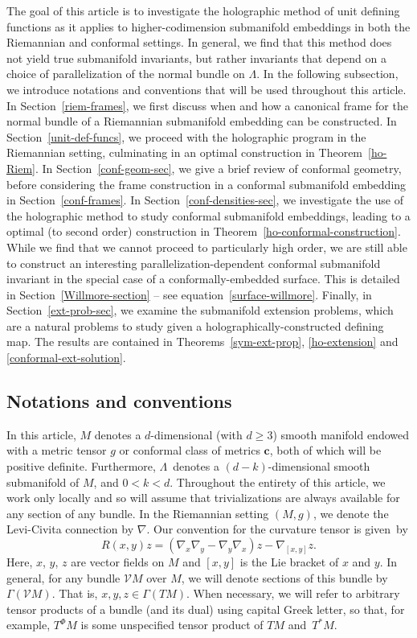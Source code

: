 \documentclass[pdftex]{sigma}
\numberwithin{equation}{section}
\newcommand{\cc}{\boldsymbol{c}}
\renewcommand{\=}{\stackrel \Lambda =}
\begin{document}
The goal of this article is to investigate the holographic method of unit defining functions as it applies to higher-codimension submanifold embeddings in both the Riemannian and conformal settings. In general, we find that this method does not yield true submanifold invariants, but rather invariants that depend on a choice of parallelization of the normal bundle on $\Lambda$. In the following subsection, we introduce notations and conventions that will be used throughout this article. In Section~\ref{riem-frames}, we first discuss when and how a canonical frame for the normal bundle of a Riemannian submanifold embedding can be constructed. In Section~\ref{unit-def-funcs}, we proceed with the holographic program in the Riemannian setting, culminating in an optimal construction in Theorem~\ref{ho-Riem}. In Section~\ref{conf-geom-sec}, we give a brief review of conformal geometry, before considering the frame construction in a conformal submanifold embedding in Section~\ref{conf-frames}. In Section~\ref{conf-densities-sec}, we investigate the use of the holographic method to study conformal submanifold embeddings, leading to a optimal (to second order) construction in Theorem~\ref{ho-conformal-construction}. While we find that we cannot proceed to particularly high order, we are still able to construct an interesting parallelization-dependent conformal submanifold invariant in the special case of a conformally-embedded surface. This is detailed in Section~\ref{Willmore-section} -- see equation~\eqref{surface-willmore}. Finally, in Section~\ref{ext-prob-sec}, we examine the submanifold extension problems, which are a natural problems to study given a holographically-constructed defining map. The results are contained in Theorems~\ref{sym-ext-prop}, \ref{ho-extension} and \ref{conformal-ext-solution}.

\subsection{Notations and conventions}
In this article, $M$ denotes a $d$-dimensional (with $d \geq 3$) smooth manifold endowed with a metric tensor $g$ or conformal class of metrics $\cc$, both of which will be positive definite. Furthermore, $\Lambda$~denotes a $(d-k)$-dimensional smooth submanifold of $M$, and $0 < k < d$. Throughout the entirety of this article, we work only locally and so will assume that trivializations are always available for any section of any bundle. In the Riemannian setting $(M,g)$, we denote the Levi-Civita connection by $\nabla$. Our convention for the curvature tensor is given~by
\[
R(x,y)z = (\nabla_x \nabla_y - \nabla_y \nabla_x)z - \nabla_{[x,y]} z .
\]
Here, $x$, $y$, $z$ are vector fields on $M$ and $[x,y]$ is the Lie bracket of $x$ and $y$. In general, for any bundle $\mathcal{V}M$ over $M$, we will denote sections of this bundle by $\Gamma(\mathcal{V} M)$. That is, $x,y,z \in \Gamma(TM)$. When necessary, we will refer to arbitrary tensor products of a bundle (and its dual) using capital Greek letter, so that, for example, $T^\Phi M$ is some unspecified tensor product of $TM$ and~$T^* M$.
\end{document}
